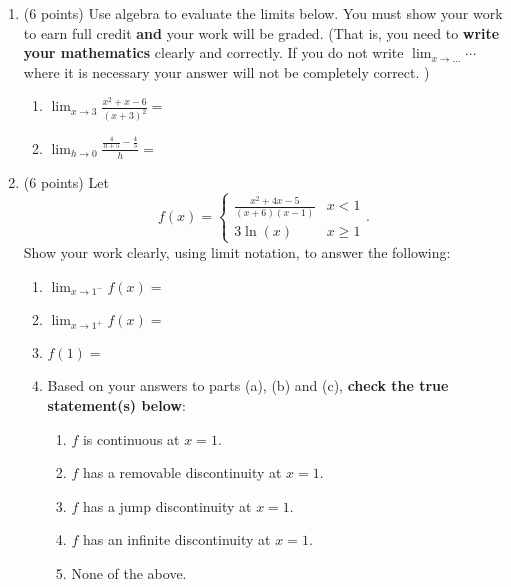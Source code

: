 \documentclass[12pt]{article}
\renewcommand{\emph}[1]{\textsf{\textbf{#1}}}
\renewcommand{\d}{\displaystyle}
\newcommand{\ds}{\displaystyle}
\begin{document}
\begin{enumerate}

\newpage

\item (6 points) Use algebra to evaluate the limits below. You must show your work to earn full credit \emph{and} your work will be graded. (That is, you need to \emph{write your mathematics} clearly and correctly. If you do not write $\ds{\lim_{x \to \ldots} \cdots}$ where it is necessary your answer will not be completely correct.%
)
	\begin{enumerate}
	\item $\d \lim_{x \to 3} \frac{x^2+x-6}{(x+3)^{2}}=$
	\vfill
	\item $\d \lim_{h \to 0} \frac{\frac{4}{h+5} - \frac{4}{5}}{h}=$
	\vfill
	\end{enumerate}
	
	
\item (6 points) Let \[f(x)=\begin{cases} \frac{x^2+4 x-5}{(x + 6)(x-1)} & x < 1\\ 3\ln(x)& x \geq 1 \end{cases}.\] Show your work clearly, using limit notation, to answer the following:
\begin{enumerate}
	\item $\d \lim_{x \to 1^-} f(x) = $
	\vspace{1in}
	\item  $\d \lim_{x \to 1^+} f(x) = $
	\vspace{.25in}
	\item  $f(1) = $
	\vspace{.25in}
	\item Based on your answers to parts (a), (b) and (c), {\bf check the true statement(s) below}:
	\begin{multicols}{2}
	\begin{enumerate}[$\Box$]
		\item $f$ is continuous at $x=1$.
		\item $f$ has a removable discontinuity at $x=1$.
		\item $f$ has a jump discontinuity at $x=1$.
		\columnbreak
		\item $f$ has an infinite discontinuity at $x=1$.
		\item None of the above.
	\end{enumerate}
	\end{multicols}
\end{enumerate}
\end{enumerate}
\end{document}
